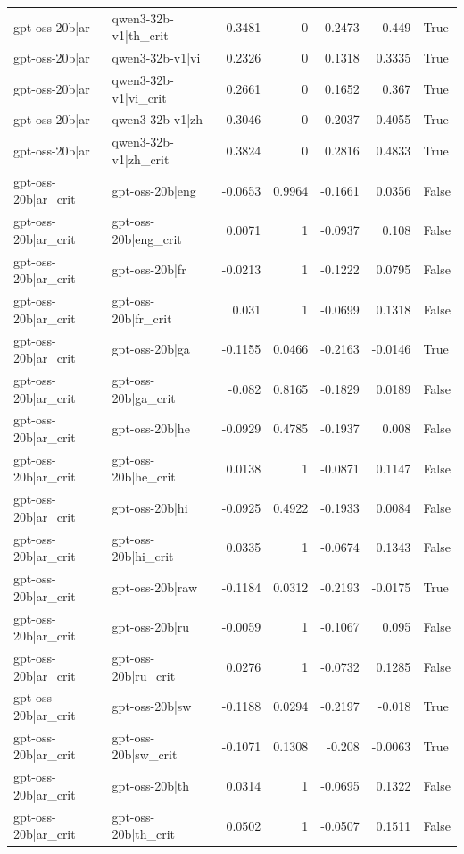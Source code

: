 \begin{table}
\begin{tabular}{l l r r r r l}
gpt-oss-20b|ar & qwen3-32b-v1|th_crit & 0.3481 & 0 & 0.2473 & 0.449 & True \\
gpt-oss-20b|ar & qwen3-32b-v1|vi & 0.2326 & 0 & 0.1318 & 0.3335 & True \\
gpt-oss-20b|ar & qwen3-32b-v1|vi_crit & 0.2661 & 0 & 0.1652 & 0.367 & True \\
gpt-oss-20b|ar & qwen3-32b-v1|zh & 0.3046 & 0 & 0.2037 & 0.4055 & True \\
gpt-oss-20b|ar & qwen3-32b-v1|zh_crit & 0.3824 & 0 & 0.2816 & 0.4833 & True \\
gpt-oss-20b|ar_crit & gpt-oss-20b|eng & -0.0653 & 0.9964 & -0.1661 & 0.0356 & False \\
gpt-oss-20b|ar_crit & gpt-oss-20b|eng_crit & 0.0071 & 1 & -0.0937 & 0.108 & False \\
gpt-oss-20b|ar_crit & gpt-oss-20b|fr & -0.0213 & 1 & -0.1222 & 0.0795 & False \\
gpt-oss-20b|ar_crit & gpt-oss-20b|fr_crit & 0.031 & 1 & -0.0699 & 0.1318 & False \\
gpt-oss-20b|ar_crit & gpt-oss-20b|ga & -0.1155 & 0.0466 & -0.2163 & -0.0146 & True \\
gpt-oss-20b|ar_crit & gpt-oss-20b|ga_crit & -0.082 & 0.8165 & -0.1829 & 0.0189 & False \\
gpt-oss-20b|ar_crit & gpt-oss-20b|he & -0.0929 & 0.4785 & -0.1937 & 0.008 & False \\
gpt-oss-20b|ar_crit & gpt-oss-20b|he_crit & 0.0138 & 1 & -0.0871 & 0.1147 & False \\
gpt-oss-20b|ar_crit & gpt-oss-20b|hi & -0.0925 & 0.4922 & -0.1933 & 0.0084 & False \\
gpt-oss-20b|ar_crit & gpt-oss-20b|hi_crit & 0.0335 & 1 & -0.0674 & 0.1343 & False \\
gpt-oss-20b|ar_crit & gpt-oss-20b|raw & -0.1184 & 0.0312 & -0.2193 & -0.0175 & True \\
gpt-oss-20b|ar_crit & gpt-oss-20b|ru & -0.0059 & 1 & -0.1067 & 0.095 & False \\
gpt-oss-20b|ar_crit & gpt-oss-20b|ru_crit & 0.0276 & 1 & -0.0732 & 0.1285 & False \\
gpt-oss-20b|ar_crit & gpt-oss-20b|sw & -0.1188 & 0.0294 & -0.2197 & -0.018 & True \\
gpt-oss-20b|ar_crit & gpt-oss-20b|sw_crit & -0.1071 & 0.1308 & -0.208 & -0.0063 & True \\
gpt-oss-20b|ar_crit & gpt-oss-20b|th & 0.0314 & 1 & -0.0695 & 0.1322 & False \\
gpt-oss-20b|ar_crit & gpt-oss-20b|th_crit & 0.0502 & 1 & -0.0507 & 0.1511 & False \\

\end{tabular}
\end{table}
